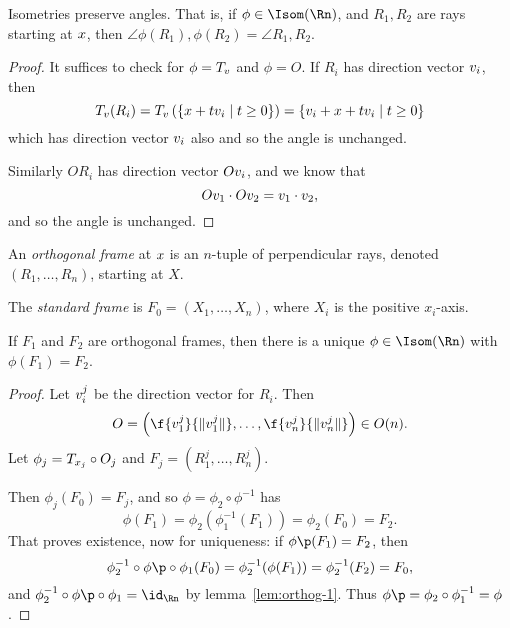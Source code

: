 \begin{corollary}
	Isometries preserve angles. That is, if $\phi\in\Isom(\Rn)$, and $R_1,R_2$ are rays starting at $x$, then $\angle\phi(R_1),\phi(R_2) = \angle R_1,R_2$. %
\end{corollary}

\begin{proof}
	It suffices to check for $\phi=T_{v}$ and $\phi=O$. If $R_i$ has direction vector $v_i$, then
	\begin{equation*}
		T_{v}(R_i)
		= T_{v}\left( \left\{x+tv_i \mid t\geq 0 \right\} \right)
		= \left\{v_i+x+tv_i \mid t\geq 0 \right\}
	\end{equation*}
	which has direction vector $v_i$ also and so the angle is unchanged.

	Similarly $OR_i$ has direction vector $Ov_i$, and we know that
	\begin{equation*}
		Ov_1 \cdot Ov_2 = v_1 \cdot v_2,
	\end{equation*}
	and so the angle is unchanged.
\end{proof}

	\pagebreak

\begin{definition}
	An \emph{orthogonal frame} at $x$ is an $n$-tuple of perpendicular rays, denoted $(R_1,\ldots,R_n)$, starting at $X$. %
	
	The \emph{standard frame} is $F_0=(X_1,\ldots,X_n)$, where $X_i$ is the positive $x_i$-axis. %
\end{definition}

\begin{corollary} %
	If $F_1$ and $F_2$ are orthogonal frames, then there is a unique $\phi\in\Isom(\Rn)$ with $\phi(F_1)=F_2$. %
\end{corollary}

\begin{proof}
	Let $v_i^j$ be the direction vector for $R_i$. Then %
	\begin{equation*}
		O = \left( \f{\vv_1^j}{\Vert \vv_1^j \Vert}, \ldots, \f{\vv_n^j}{\Vert \vv_n^j \Vert} \right) \in O(n).
	\end{equation*}
	Let $\phi_j = T_{x_j} \circ O_j$ and $F_j = (R_1^j, \ldots, R_n^j)$.
	
	Then $\phi_j(F_0) = F_j$, and so $\phi=\phi_2\circ\phi^{-1}$ has
	\begin{equation*}
		\phi(F_1) =\phi_2(\phi_1^{-1}(F_1)) = \phi_2(F_0) = F_2.
	\end{equation*}
	That proves existence, now for uniqueness: if $\phi\p(F_1) = F_2$, then
	\begin{equation*}
		\phi_2^{-1} \circ \phi\p \circ \phi_1(F_0) = \phi_2^{-1}(\phi(F_1)) = \phi_2^{-1}(F_2) = F_0,
	\end{equation*}
	and $\phi_2^{-1} \circ \phi\p \circ \phi_1 = \id_{\Rn}$ by lemma~\ref{lem:orthog-1}. Thus $\phi\p = \phi_2 \circ \phi_1^{-1} = \phi$. %
\end{proof}

